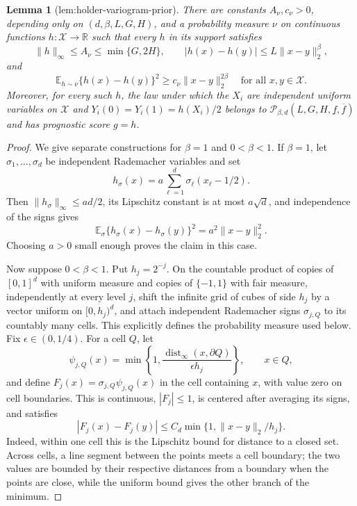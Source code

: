 \documentclass{article}
\newtheorem{lemma}{Lemma}
\begin{document}
\begin{lemma}[lem:holder-variogram-prior]\label{lem:holder-variogram-prior}
There are constants \(A_\nu,c_\nu>0\), depending only on \((d,\beta,L,G,H)\), and a probability measure \(\nu\) on continuous functions \(h:\mathcal X\to\mathbb R\) such that every \(h\) in its support satisfies
\[
\|h\|_\infty\le A_\nu\le\min\{G,2H\},\qquad |h(x)-h(y)|\le L\|x-y\|_2^\beta,
\]
and
\[
\mathbb E_{h\sim\nu}\{h(x)-h(y)\}^2\ge c_\nu\|x-y\|_2^{2\beta}
\quad\text{for all }x,y\in\mathcal X.
\]
Moreover, for every such \(h\), the law under which the \(X_i\) are independent uniform variables on \(\mathcal X\) and \(Y_i(0)=Y_i(1)=h(X_i)/2\) belongs to \(\mathcal P_{\beta,d}(L,G,H,\underline f,\overline f)\) and has prognostic score \(g=h\).
\end{lemma}
\begin{proof}
We give separate constructions for \(\beta=1\) and \(0<\beta<1\).  If \(\beta=1\), let \(\sigma_1,\ldots,\sigma_d\) be independent Rademacher variables and set
\[
h_\sigma(x)=a\sum_{\ell=1}^d\sigma_\ell(x_\ell-1/2).
\]
Then \(\|h_\sigma\|_\infty\le ad/2\), its Lipschitz constant is at most \(a\sqrt d\), and independence of the signs gives
\[
\mathbb E_\sigma\{h_\sigma(x)-h_\sigma(y)\}^2=a^2\|x-y\|_2^2.
\]
Choosing \(a>0\) small enough proves the claim in this case.

Now suppose \(0<\beta<1\).  Put \(h_j=2^{-j}\).  On the countable product of copies of \([0,1]^d\) with uniform measure and copies of \(\{-1,1\}\) with fair measure, independently at every level \(j\), shift the infinite grid of cubes of side \(h_j\) by a vector uniform on \([0,h_j)^d\), and attach independent Rademacher signs \(\sigma_{j,Q}\) to its countably many cells.  This explicitly defines the probability measure used below.  Fix \(\epsilon\in(0,1/4)\).  For a cell \(Q\), let
\[
\psi_{j,Q}(x)=\min\left\{1,\frac{\operatorname{dist}_\infty(x,\partial Q)}{\epsilon h_j}\right\},\qquad x\in Q,
\]
and define \(F_j(x)=\sigma_{j,Q}\psi_{j,Q}(x)\) in the cell containing \(x\), with value zero on cell boundaries.  This is continuous, \(|F_j|\le1\), is centered after averaging its signs, and satisfies
\[
|F_j(x)-F_j(y)|\le C_d\min\{1,\|x-y\|_2/h_j\}.
\]
Indeed, within one cell this is the Lipschitz bound for distance to a closed set.  Across cells, a line segment between the points meets a cell boundary; the two values are bounded by their respective distances from a boundary when the points are close, while the uniform bound gives the other branch of the minimum.


\end{proof}
\end{document}
